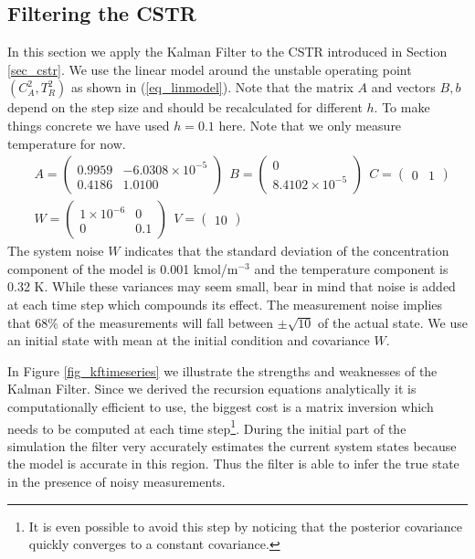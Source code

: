 \subsection{Filtering the CSTR}
\label{sec_filtering_linmods}
In this section we apply the Kalman Filter to the CSTR introduced in Section \ref{sec_cstr}. We use the linear model around the unstable operating point $(C_A^2, T_R^2)$ as shown in (\ref{eq_linmodel}). Note that the matrix $A$ and vectors $B, b$ depend on the step size and should be recalculated for different $h$. To make things concrete we have used $h=0.1$ here. Note that we only measure temperature for now.
\begin{equation}
\begin{aligned}
&A = \begin{pmatrix}
0.9959 & -6.0308\times 10^{-5} \\
0.4186 & 1.0100
\end{pmatrix} ~~
B = \begin{pmatrix}
0 \\ 8.4102\times 10^{-5}
\end{pmatrix} ~~
C = \begin{pmatrix}
0 & 1
\end{pmatrix} \\
&W = \begin{pmatrix}
1\times 10^{-6} & 0 \\ 0 & 0.1
\end{pmatrix} ~~
V = \begin{pmatrix}
10
\end{pmatrix}
\end{aligned}
\label{eq_linmodel}
\end{equation}
The system noise $W$ indicates that the standard deviation of the concentration component of the model is 0.001 kmol/m$^{-3}$ and the temperature component is 0.32 K. While these variances may seem small, bear in mind that noise is added at each time step which compounds its effect. The measurement noise implies that 68\% of the measurements will fall between $\pm\sqrt{10}$ of the actual state. We use an initial state with mean at the initial condition and covariance $W$.

In Figure \ref{fig_kftimeseries} we illustrate the strengths and weaknesses of the Kalman Filter. Since we derived the recursion equations analytically it is computationally efficient to use, the biggest cost is a matrix inversion which needs to be computed at each time step\footnote{It is even possible to avoid this step by noticing that the posterior covariance quickly converges to a constant covariance.}. During the initial part of the simulation the filter very accurately estimates the current system states because the model is accurate in this region. Thus the filter is able to infer the true state in the presence of noisy measurements. 


